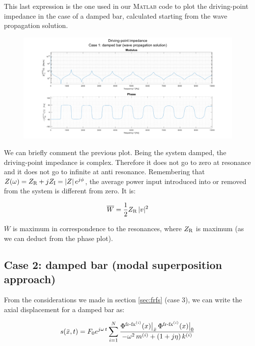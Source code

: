 \documentclass[a4paper,12pt,oneside]{article}
\begin{document}
This last expression is the one used in our \textsc{Matlab} code to plot the driving-point impedance in the case of a damped bar, calculated starting from the wave propagation solution.

\begin{figure}[h]
	\hspace{-70pt}
	\includegraphics[scale=0.4]{impedance_wave_propagation_solution}
\end{figure}

We can briefly comment the previous plot. Being the system damped, the driving-point impedance is complex. Therefore it does not go to zero at resonance and it does not go to infinite at anti resonance.
Remembering that $ Z(\omega) = Z_\textup{R} + j Z_\textup{I} = |Z| \, e^{j \phi} $, the average power input introduced into or removed from the system is different from zero. It is:

\[
	\overline{W} = \frac{1}{2} Z_\textup{R} \, |v|^2
\]

$ \overline{W} $ is maximum in correspondence to the resonances, where $ Z_\textup{R} $ is maximum (as we can deduct from the phase plot).

\subsection*{Case 2: damped bar (modal superposition approach)}

From the considerations we made in section \ref{sec:frfs} (case 3), we can write the axial displacement for a damped bar as:

\[ \begin{split}
	s(\bar{x},t) = F_0 e^{j \omega \, t}
		\sum_{i=1}^N \frac{\Phi^{\textup{fr-fx}^{(i)}}(x)\big|_{\bar{x}} \,
		\Phi^{\textup{fr-fx}^{(i)}}(x)\big|_0}
		{-\omega^2 \, m^{(i)} + (1 + j \eta) \, k^{(i)}}
\end{split} \]
\end{document}
